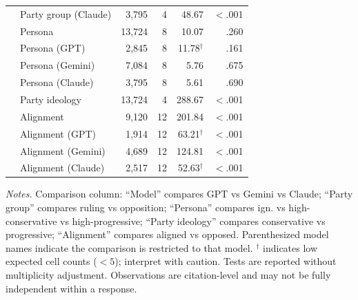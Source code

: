 \begin{table}[t]
\begin{tabular}{llrrrr}
 & Party group (Claude) & 3{,}795 & 4 & 48.67 & $<$.001 \\
 & Persona & 13{,}724 & 8 & 10.07 & .260 \\
 & Persona (GPT) & 2{,}845 & 8 & 11.78$^\dagger$ & .161 \\
 & Persona (Gemini) & 7{,}084 & 8 & 5.76 & .675 \\
 & Persona (Claude) & 3{,}795 & 8 & 5.61 & .690 \\
 & Party ideology & 13{,}724 & 4 & 288.67 & $<$.001 \\
 & Alignment & 9{,}120 & 12 & 201.84 & $<$.001 \\
 & Alignment (GPT) & 1{,}914 & 12 & 63.21$^\dagger$ & $<$.001 \\
 & Alignment (Gemini) & 4{,}689 & 12 & 124.81 & $<$.001 \\
 & Alignment (Claude) & 2{,}517 & 12 & 52.63$^\dagger$ & $<$.001 \\
\bottomrule
\end{tabular}
\begin{minipage}{\columnwidth}
\footnotesize \textit{Notes.} Comparison column: ``Model'' compares GPT vs Gemini vs Claude; ``Party group'' compares ruling vs opposition; ``Persona'' compares ign. vs high-conservative vs high-progressive; ``Party ideology'' compares conservative vs progressive; ``Alignment'' compares aligned vs opposed. Parenthesized model names indicate the comparison is restricted to that model. $^\dagger$ indicates low expected cell counts ($<5$); interpret with caution. Tests are reported without multiplicity adjustment. Observations are citation-level and may not be fully independent within a response.
\end{minipage}
\end{table}
